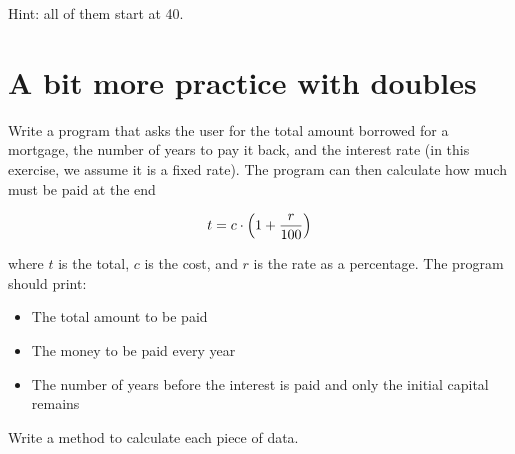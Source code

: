 \documentclass{article}
\begin{document}
Hint: all of them start at 40.


\section{A bit more practice with doubles}
\label{sec:bit-more-practice}

Write a program that asks the user for the total amount borrowed for a
mortgage, the number of years to pay it back, and the interest rate
(in this exercise, we assume it is a fixed 
rate). The program can then calculate how much must be paid at the end

$$t = c \cdot \left(1+ {r \over 100}\right)$$

where $t$ is the total, $c$ is the cost,
and $r$ is the rate as a percentage. The program should print: 

\begin{itemize}
\item The total amount to be paid
\item The money to be paid every year
\item The number of years before the interest is paid and only the
  initial capital remains
\end{itemize}

Write a method to calculate each piece of data. 

%



\end{document}
